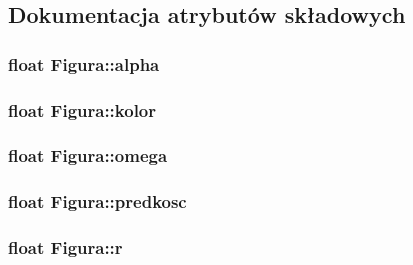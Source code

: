 \subsection{Dokumentacja atrybutów składowych}
\hypertarget{classFigura_a601361fbb05bc4dc3b9cab1a868b2910}{
\subsubsection[{alpha}]{\setlength{\rightskip}{0pt plus 5cm}float Figura\-::alpha\hspace{0.3cm}{\ttfamily [protected]}}}\label{classFigura_a601361fbb05bc4dc3b9cab1a868b2910}
\hypertarget{classFigura_ab05a5e9bebed67a5d20d758999cd5d1a}{
\subsubsection[{kolor}]{\setlength{\rightskip}{0pt plus 5cm}float Figura\-::kolor\hspace{0.3cm}{\ttfamily [protected]}}}\label{classFigura_ab05a5e9bebed67a5d20d758999cd5d1a}
\hypertarget{classFigura_a01436a48e3702376968890266d045dbe}{
\subsubsection[{omega}]{\setlength{\rightskip}{0pt plus 5cm}float Figura\-::omega\hspace{0.3cm}{\ttfamily [protected]}}}\label{classFigura_a01436a48e3702376968890266d045dbe}
\hypertarget{classFigura_a890207e032e201a3a75ab9680c90dec7}{
\subsubsection[{predkosc}]{\setlength{\rightskip}{0pt plus 5cm}float Figura\-::predkosc\hspace{0.3cm}{\ttfamily [protected]}}}\label{classFigura_a890207e032e201a3a75ab9680c90dec7}
\hypertarget{classFigura_af4ea0a1b316060276b8cde2bc11ca190}{
\subsubsection[{r}]{\setlength{\rightskip}{0pt plus 5cm}float Figura\-::r\hspace{0.3cm}{\ttfamily [protected]}}}\label{classFigura_af4ea0a1b316060276b8cde2bc11ca190}
